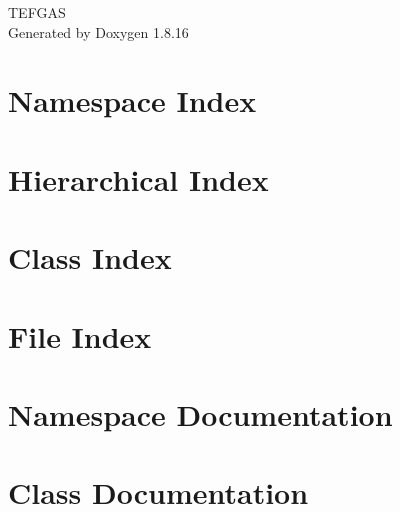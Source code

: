\let\mypdfximage\pdfximage\def\pdfximage{\immediate\mypdfximage}\documentclass[twoside]{book}
\newcommand{\+}{\discretionary{\mbox{\scriptsize$\hookleftarrow$}}{}{}}
\newcommand{\clearemptydoublepage}{%
  \newpage{\pagestyle{empty}\cleardoublepage}%
}
\begin{document}
\hypersetup{pageanchor=false,
             bookmarksnumbered=true,
             pdfencoding=unicode
            }
\begin{titlepage}
\vspace*{7cm}
\begin{center}%
{\Large T\+E\+F\+G\+AS }\\
\vspace*{1cm}
{\large Generated by Doxygen 1.8.16}\\
\end{center}
\end{titlepage}
\clearemptydoublepage
{}
\tableofcontents
\clearemptydoublepage
{}
\hypersetup{pageanchor=true}

\chapter{Namespace Index}

\chapter{Hierarchical Index}

\chapter{Class Index}

\chapter{File Index}

\chapter{Namespace Documentation}

\chapter{Class Documentation}




































\end{document}
